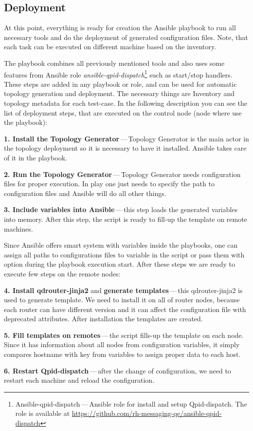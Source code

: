 \subsection{Deployment}
At this point, everything is ready for creation the Ansible playbook to run all necessary tools and do the deployment of generated configuration files. Note, that each task can be executed on different machine based on the inventory.

The playbook combines all previously mentioned tools and also uses some features from Ansible role \emph{ansible-qpid-dispatch}\footnote{Ansible-qpid-dispatch\,---\,Ansible role for install
and setup Qpid-dispatch. The role is available at \url{https://github.com/rh-messaging-qe/ansible-qpid-dispatch}} such as start/stop handlers. These steps are added in any playbook or role, and can be used for automatic topology generation and deployment. The necessary things are Inventory and topology metadata for each test-case. In the following description you can see the list of deployment steps, that are executed on the control node (node where use the playbook):

\begin{description}
	\item \textbf{1. Install the Topology Generator}\,---\,Topology Generator is the main actor in the topology deployment so it is necessary to have it installed. Ansible takes care of it in the playbook.
	\item \textbf{2. Run the Topology Generator}\,---\,Topology Generator needs configuration files for proper execution. In play one just needs to specify the path to configuration files and Ansible will do all other things.
	\item \textbf{3. Include variables into Ansible}\,---\,this step loads the generated variables into memory. After this step, the script is ready to fill-up the template on remote machines.
\end{description}

Since Ansible offers smart system with variables inside the playbooks, one can assign all paths to configurations files to variable in the script or pass them with option during the playbook execution start. After these steps we are ready to execute few steps on the remote nodes:

\begin{description}
	\item \textbf{4. Install qdrouter-jinja2} and \textbf{generate templates}\,---\,this qdrouter-jinja2 is used to generate template. We need to install it on all of router nodes, because each router can have different version and it can affect the configuration file with deprecated attributes. After installation the templates are created.
	\item \textbf{5. Fill templates on remotes}\,---\,the script fills-up the template on each node. Since it has information about all nodes from configuration variables, it simply compares hostname with key from variables to assign proper data to each host.
	\item \textbf{6. Restart Qpid-dispatch}\,---\,after the change of configuration, we need to restart each machine and reload the configuration.
\end{description}

